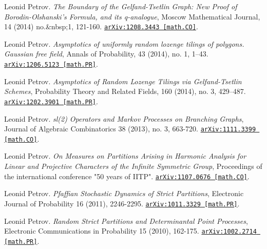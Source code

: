 \begin{etaremune}
\item 
Leonid Petrov.
\emph{The Boundary of the Gelfand-Tsetlin Graph: New Proof of Borodin-Olshanski’s Formula, and its q-analogue}, Moscow Mathematical Journal, 14 (2014) no.&nbsp;1, 121-160. 
\href{https://arxiv.org/abs/1208.3443}{\texttt{arXiv:1208.3443 [math.CO]}}.



\item 
Leonid Petrov.
\emph{Asymptotics of uniformly random lozenge tilings of polygons. Gaussian free field}, Annals of Probability, 43 (2014), no. 1, 1–43. 
\href{https://arxiv.org/abs/1206.5123}{\texttt{arXiv:1206.5123 [math.PR]}}.





\item 
Leonid Petrov.
\emph{Asymptotics of Random Lozenge Tilings via Gelfand-Tsetlin Schemes}, Probability Theory and Related Fields, 160 (2014), no. 3, 429–487. 
\href{https://arxiv.org/abs/1202.3901}{\texttt{arXiv:1202.3901 [math.PR]}}.







\item 
Leonid Petrov.
\emph{sl(2) Operators and Markov Processes on Branching Graphs}, Journal of Algebraic Combinatorics 38 (2013), no. 3, 663-720. 
\href{https://arxiv.org/abs/1111.3399}{\texttt{arXiv:1111.3399 [math.CO]}}.







\item 
Leonid Petrov.
\emph{On Measures on Partitions Arising in Harmonic Analysis for Linear and Projective Characters of the Infinite Symmetric Group}, Proceedings of the international conference "50 years of IITP". 
\href{https://arxiv.org/abs/1107.0676}{\texttt{arXiv:1107.0676 [math.CO]}}.





\item 
Leonid Petrov.
\emph{Pfaffian Stochastic Dynamics of Strict Partitions}, Electronic Journal of Probability 16 (2011), 2246-2295. 
\href{https://arxiv.org/abs/1011.3329}{\texttt{arXiv:1011.3329 [math.PR]}}.



\item 
Leonid Petrov.
\emph{Random Strict Partitions and Determinantal Point Processes}, Electronic Communications in Probability 15 (2010), 162-175. 
\href{https://arxiv.org/abs/1002.2714}{\texttt{arXiv:1002.2714 [math.PR]}}.








\end{etaremune}

